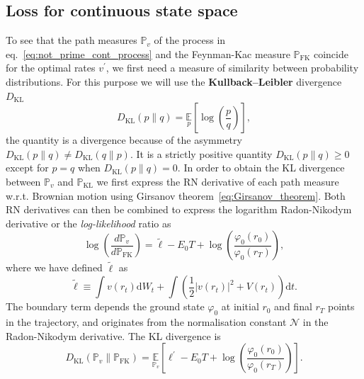 \subsection{Loss for continuous state space}
\label{subsec:continuous_loss}
To see that the path measures $\mathbb{P}_v$ of the process in eq.~\eqref{eq:not_prime_cont_process}  and the Feynman-Kac measure $\mathbb{P}_{\mathrm{FK}}$ coincide for the optimal rates $v^\prime$, we first need a measure of similarity between probability distributions. For this purpose we will use the \textbf{Kullback–Leibler} divergence $D_{\mathrm{KL}}$
\begin{equation}
	D_{\mathrm{KL}}(p \| q)=\underset{p}{\mathbb{E}}\left[\log \left(\frac{p}{q}\right)\right],
\end{equation}
the quantity is a divergence because of the asymmetry $D_{\mathrm{KL}}(p \| q) \neq D_{\mathrm{KL}}(q \| p)$. It is a strictly positive quantity $D_{\mathrm{KL}}(p \| q) \geq 0$ except for $p = q$ when $D_{\mathrm{KL}}(p \| q) = 0$. In order to obtain the KL divergence between $\mathbb{P}_v$ and $\mathbb{P}_{\mathrm{KL}}$ we first express the RN derivative of each path measure w.r.t. Brownian motion using Girsanov theorem~\eqref{eq:Girsanov_theorem}. Both RN derivatives can then be combined to express the logarithm Radon-Nikodym derivative or the \emph{log-likelihood} ratio as
\begin{equation}
\log \left(\frac{d \mathbb{P}_{v}}{d \mathbb{P}_{\mathrm{FK}}}\right)=
\tilde{\ell}-
E_{0} T+
\log 
\left(
\frac{\varphi_{0}\left(r_{0}\right)}{\varphi_{0}\left(r_{T}\right)}
\right),
\end{equation}
where we have defined $\tilde{\ell}$ as
\begin{equation}
\tilde{\ell} \equiv \int v\left(r_{t}\right) \mathrm{d} W_{t}+\int \left(\frac{1}{2}\left|v\left(r_{t}\right)\right|^{2}+V\left(r_{t}\right)\right)\mathrm{d} t.
\end{equation}
The boundary term depends the ground state $\varphi_0$ at initial $r_0$ and final $r_T$ points in the trajectory, and originates from the normalisation constant $\mathcal{N}$ in the Radon-Nikodym derivative. The KL divergence is 
\begin{equation}
\label{eq:ltilde-cont}
D_{\mathrm{KL}}\left(\mathbb{P}_{v} \| \mathbb{P}_{\mathrm{FK}}\right)=\underset{\mathbb{P}_{v}}{\mathbb{E}}\left[\ell^\prime-E_{0} T+\log \left(\frac{\varphi_{0}\left(r_{0}\right)}{\varphi_{0}\left(r_{T}\right)}\right)\right].
\end{equation}
